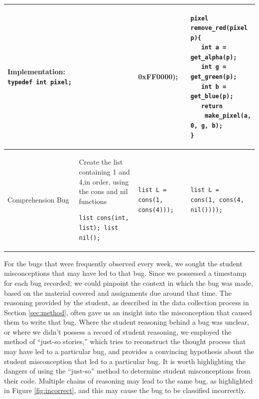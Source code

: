 \documentclass{sig-alternate}
\begin{document}
\begin{table}
\begin{tabular}{|p{0.9in}|p{2.1in}|p{1.7in}|p{1.7in}|}
\textbf{Implementation:} \verb|typedef int pixel;|
\vspace{0.1in}
&
\vspace{-0.2in}
\begin{verbatim}
pixel remove_red(pixel p){
   return (p & 0xFF0000);
}
\end{verbatim}
&
\vspace{-0.2in}
\begin{verbatim}
pixel remove_red(pixel p){
   int a = get_alpha(p);
   int g = get_green(p);
   int b = get_blue(p);
   return
    make_pixel(a, 0, g, b);
}
\end{verbatim}\\
\hline
Comprehension Bug &
Create the list containing 1 and 4,in order, using the cons and nil functions
\begin{verbatim}
list cons(int, list); list nil();
\end{verbatim}
&
\vspace{-0.2in}
\begin{verbatim}
list L = cons(1, cons(4)));
\end{verbatim}
\vspace{-0.2in}
&
\vspace{-0.2in}
\begin{verbatim}
list L =
cons(1, cons(4, nil())));
\end{verbatim}
\vspace{-0.2in}
\\ \hline
\end{tabular}
\end{table}

For the bugs that were frequently observed every week, we sought the student misconceptions that may have led to that bug. Since we possessed a timestamp for each bug recorded, we could pinpoint the context in which the bug was made, based on the material covered and assignments due around that time. The reasoning provided by the student, as described in the data collection process in Section \ref{sec:method}, often gave us an insight into the misconception that caused them to write that bug. Where the student reasoning behind a bug was unclear, or where we didn't possess a record of student reasoning, we employed the method of ``just-so stories,'' \cite{JoniSolowayGoldmanEhrlich83} which tries to reconstruct the thought process that may have led to a particular bug, and provides a convincing hypothesis about the student misconception that led to a particular bug. It is worth highlighting the dangers of using the ``just-so'' method to determine student misconceptions from their code. Multiple chains of reasoning may lead to the same bug, as highlighted in Figure \ref{fig:incorrect}, and this may cause the bug to be classified incorrectly.\\
\end{document}
